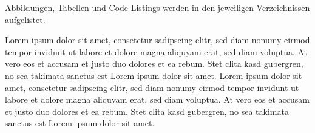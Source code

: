 Abbildungen, Tabellen und Code-Listings werden in den jeweiligen Verzeichnissen aufgelistet.


Lorem ipsum dolor sit amet, consetetur sadipscing elitr, sed diam nonumy eirmod tempor invidunt ut labore et dolore magna aliquyam erat, sed diam voluptua. At vero eos et accusam et justo duo dolores et ea rebum. Stet clita kasd gubergren, no sea takimata sanctus est Lorem ipsum dolor sit amet.  Lorem ipsum dolor sit amet, consetetur sadipscing elitr, sed diam nonumy eirmod tempor invidunt ut labore et dolore magna aliquyam erat, sed diam voluptua. At vero eos et accusam et justo duo dolores et ea rebum. Stet clita kasd gubergren, no sea takimata sanctus est Lorem ipsum dolor sit amet.


